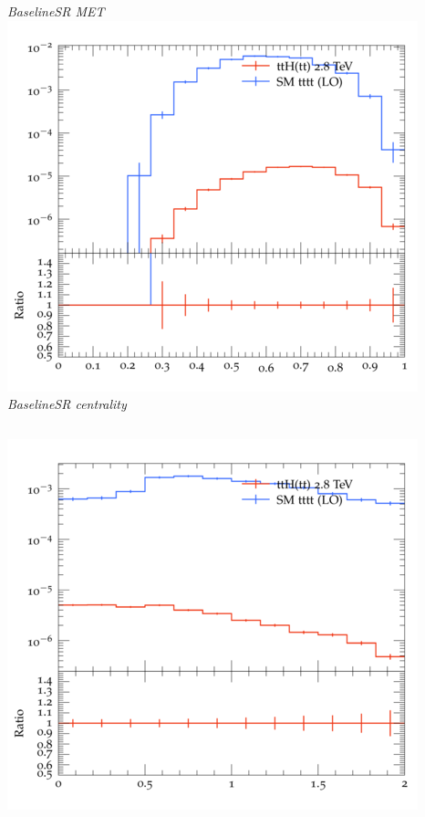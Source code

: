 \documentclass{beamer}
\begin{document}
\begin{frame}
\begin{columns}
\textit{\small BaselineSR MET}
\includegraphics[width=\textwidth]{../plots/ttH_2800/tttt_ttH_1LOS/BaselineSR_centrality.png}\\
\textit{\small BaselineSR centrality}
\end{columns}
\begin{columns}
\includegraphics[width=\textwidth]{../plots/ttH_2800/tttt_ttH_1LOS/BaselineSR_deltaR_bl_min.png}\\

\end{columns}
\end{frame}
\end{document}
